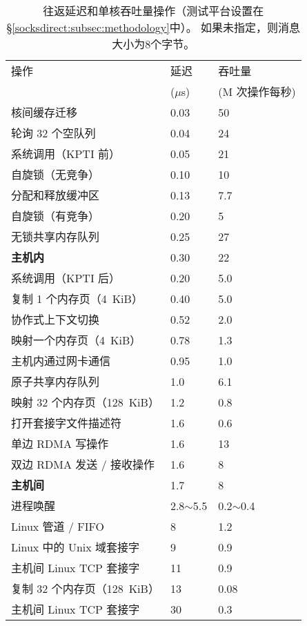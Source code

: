 \begin{table}[t]
	\centering
	\caption{往返延迟和单核吞吐量操作（测试平台设置在\S \ref {socksdirect:subsec:methodology}中）。 如果未指定，则消息大小为8个字节。}
	\label{socksdirect:tab:operation-performance}
	\small
		\begin{tabular}{l|l|l|}
			\hline
			操作	& 延迟  & 吞吐量  \\
			& ($\mu$s) & (M 次操作每秒) \\
			\hline
			\hline
			核间缓存迁移	& 0.03 & 50 \\
			\hline
			轮询 32 个空队列 & 0.04 & 24 \\
			\hline
			系统调用（KPTI 前） & 0.05 & 21 \\
			\hline
			自旋锁（无竞争） & 0.10 & 10 \\
			\hline
			分配和释放缓冲区 & 0.13 & 7.7 \\
			\hline
			自旋锁（有竞争） & 0.20 & 5 \\
			\hline
			无锁共享内存队列 & 0.25 & 27 \\
			\hline
			\textbf{主机内 \sys} & 0.30 & 22 \\
			\hline
			系统调用（KPTI 后） & 0.20 & 5.0 \\
			\hline
			复制 1 个内存页（4~KiB） & 0.40 & 5.0 \\
			\hline
			协作式上下文切换 & 0.52 & 2.0 \\
			\hline
			映射一个内存页（4~KiB） & 0.78 & 1.3 \\
			\hline
			主机内通过网卡通信 & 0.95 & 1.0 \\
			\hline
			原子共享内存队列 & 1.0 & 6.1 \\
			\hline
			映射 32 个内存页（128~KiB） & 1.2 & 0.8 \\
			\hline
			打开套接字文件描述符 & 1.6 & 0.6 \\
			\hline
			单边 RDMA 写操作 & 1.6 & 13 \\
			\hline
			双边 RDMA 发送 / 接收操作 & 1.6 & 8 \\
			\hline
			\textbf{主机间 \sys} & 1.7 & 8 \\
			\hline
			进程唤醒 & 2.8$\sim$5.5 & 0.2$\sim$0.4 \\
			\hline
			Linux 管道 / FIFO & 8 & 1.2 \\
			\hline
			Linux 中的 Unix 域套接字 & 9 & 0.9 \\
			\hline
			主机间 Linux TCP 套接字 & 11 & 0.9 \\
			\hline
			复制 32 个内存页（128~KiB） & 13 & 0.08 \\
			\hline
			主机间 Linux TCP 套接字 & 30 & 0.3 \\
			\hline
		\end{tabular}	
\end{table}


